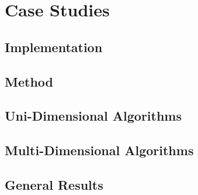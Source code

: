 
\chapter{Case Studies}\label{chapter:experiments}

\section{Implementation}

\section{Method}

\section{Uni-Dimensional Algorithms}

\section{Multi-Dimensional Algorithms}

\section{General Results}
